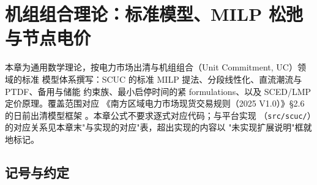 
\section{机组组合理论：标准模型、MILP 松弛与节点电价}

\begin{theorynote}
本章为通用数学理论，按电力市场出清与机组组合（Unit Commitment, UC）领域的标准
模型体系撰写：SCUC 的标准 MILP 提法、分段线性化、直流潮流与 PTDF、备用与储能
约束族、最小启停时间的紧 formulations、以及 SCED/LMP 定价原理。覆盖范围对应
《南方区域电力市场现货交易规则（2025 V1.0）》§2.6 的日前出清模型框架
\cite{southern2025}。本章公式不要求逐式对应代码；与平台实现
（\texttt{src/scuc/}）的对应关系见本章末"与实现的对应"表，超出实现的内容以
"未实现扩展说明"框就地标记。
\end{theorynote}

\subsection{记号与约定}

